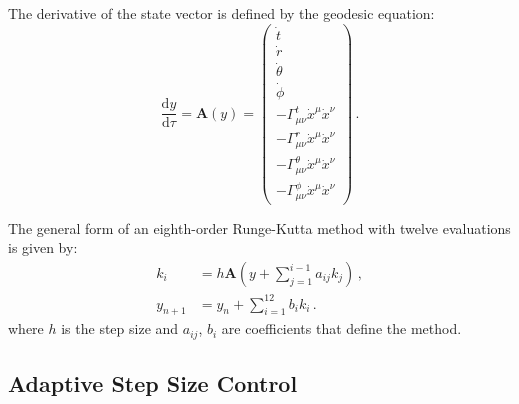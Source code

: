 \documentclass[11pt, twocolumn]{article}
\begin{document}
The derivative of the state vector is defined by the geodesic equation:
\begin{equation}
    \frac{\mathrm{d}y}{\mathrm{d}\tau} = \mathbf{A}(y) =
    \begin{pmatrix}
        \dot{t}                                               \\
        \dot{r}                                               \\
        \dot{\theta}                                          \\
        \dot{\phi}                                            \\
        -\Gamma^{t}_{\mu\nu} \dot{x}^{\mu} \dot{x}^{\nu}      \\
        -\Gamma^{r}_{\mu\nu} \dot{x}^{\mu} \dot{x}^{\nu}      \\
        -\Gamma^{\theta}_{\mu\nu} \dot{x}^{\mu} \dot{x}^{\nu} \\
        -\Gamma^{\phi}_{\mu\nu} \dot{x}^{\mu} \dot{x}^{\nu}
    \end{pmatrix} \, .
\end{equation}

The general form of an eighth-order Runge-Kutta method with twelve evaluations is given by:
\begin{equation}
    \begin{split}
        k_{i} &= h \mathbf{A} \left( y + \sum_{j=1}^{i-1} a_{ij} k_{j} \right) \, , \\
        y_{n+1} &= y_{n} + \sum_{i=1}^{12} b_{i} k_{i} \, .
    \end{split}
\end{equation}
where $h$ is the step size and $a_{ij}$, $b_{i}$ are coefficients that define the method.


\subsection{Adaptive Step Size Control}
\end{document}
